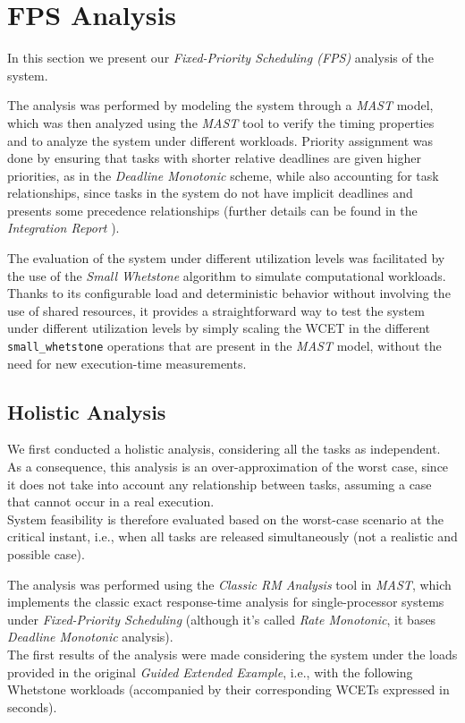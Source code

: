 \section{FPS Analysis}
In this section we present our \textit{Fixed-Priority Scheduling (FPS)} analysis
of the system.

The analysis was performed by modeling the system through a
\textit{MAST} model, which was then analyzed using the \textit{MAST} tool to verify
the timing properties and to analyze the system under different workloads.
\label{lab:priority-assignment}
Priority assignment was done by ensuring that tasks with shorter relative
deadlines are given higher priorities, as in the \textit{Deadline Monotonic}
scheme, while also accounting for task relationships, since tasks in the system
do not have implicit deadlines and presents some precedence relationships
(further details can be found in the \textit{Integration Report}
\cite{IntegrationReport}). 

The evaluation of the system under different utilization levels was facilitated
by the use of the \textit{Small Whetstone} algorithm to simulate computational
workloads. Thanks to its configurable load and deterministic behavior without
involving the use of shared resources, it provides a straightforward way to test the
system under different utilization levels by simply scaling the WCET in the different
\texttt{small\_whetstone} operations that are present in the \textit{MAST}
model, without the need for new execution-time measurements.  

\subsection{Holistic Analysis}

We first conducted a holistic analysis, considering all the tasks as
independent. As a consequence, this analysis is an over-approximation of the
worst case, since it does not take into account any relationship between tasks,
assuming a case that cannot occur in a real execution. \\
System feasibility is therefore evaluated based on the worst-case scenario at
the critical instant, i.e., when all tasks are released simultaneously (not a
realistic and possible case). 

The analysis was performed using the \textit{Classic RM Analysis} tool in
\textit{MAST}, which implements the classic exact response-time analysis for
single-processor systems under \textit{Fixed-Priority Scheduling} (although it's
called \textit{Rate Monotonic}, it bases \textit{Deadline Monotonic} analysis). \\
The first results of the analysis were made considering the system under the
loads provided in the original \textit{Guided Extended Example}, i.e.,
with the following Whetstone workloads (accompanied by their corresponding WCETs
expressed in seconds).

